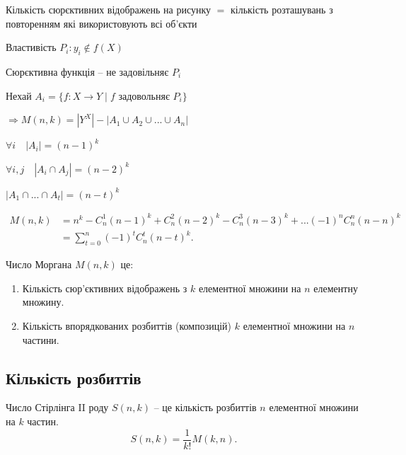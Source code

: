 Кількість сюрєктивних відображень на рисунку $=$ кількість розташувань з
повторенням які використовують всі об'єкти

Властивість $P_i: y_i \not\in f(X)$

Сюрєктивна функція -- не задовільняє $P_i$

Нехай $A_i = \{ f: X \rightarrow Y \mid f \text{ задовольняє } P_i \}$

$\Rightarrow M(n, k) = |Y^X| - |A_1 \cup A_2 \cup ... \cup A_n |$

$\forall i \quad |A_i| = (n-1)^k$

$\forall i, j \quad |A_i \cap A_j| = (n-2)^k$

$|A_1 \cap ... \cap A_t| = (n-t)^k$

\begin{equation*}
    \begin{split}
        M(n, k)
        &= n^k - C_n^1 (n-1)^k + C_n^2 (n-2)^k - C_n^3 (n-3)^k + ... (-1)^n C_n^n (n-n)^k\\
        &= \sum\limits_{t=0}^{n} (-1)^t C_n^t (n-t)^k.
    \end{split}
\end{equation*}

\begin{definition}
    Число Моргана $M(n, k)$ це:
    \begin{enumerate}
        \item Кількість сюр'єктивних відображень з $k$ елементної множини на $n$ елементну множину.
        \item Кількість впорядкованих розбиттів (композицій) $k$ елементної множини на $n$ частини.
    \end{enumerate}
\end{definition}

\subsection{Кількість розбиттів}

\begin{definition}
    Число Стірлінга II роду $S(n, k)$ -- це кількість розбиттів $n$ елементної множини на $k$ частин.
    \begin{equation*}
        S(n, k) = \dfrac{1}{k!} M(k, n).
    \end{equation*}
\end{definition}

